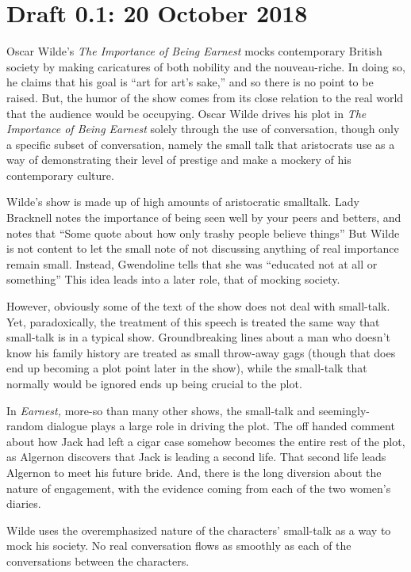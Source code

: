 \documentclass[12pt]{article}[titlepage]
\newcommand{\say}[1]{``#1''}
\newcommand{\1}{\={a}}
\newcommand{\2}{\={e}}
\newcommand{\3}{\={\i}}
\newcommand{\4}{\=o}
\newcommand{\5}{\=u}
\newcommand{\6}{\={A}}
\renewcommand{\,}{\textsuperscript{,}}
\begin{document}
\section{Draft 0.1: 20 October 2018}
Oscar Wilde's \textit{The Importance of Being Earnest} mocks contemporary British society by making caricatures of both nobility and the nouveau-riche.
In doing so, he claims that his goal is \say{art for art's sake,} and so there is no point to be raised.
But, the humor of the show comes from its close relation to the real world that the audience would be occupying.
Oscar Wilde drives his plot in \textit{The Importance of Being Earnest} solely through the use of conversation, though only a specific subset of conversation, namely the small talk that aristocrats use as a way of demonstrating their level of prestige and make a mockery of his contemporary culture.

Wilde's show is made up of high amounts of aristocratic smalltalk.
Lady Bracknell notes the importance of being seen well by your peers and betters, and notes that \say{Some quote about how only trashy people believe things}
But Wilde is not content to let the small note of not discussing anything of real importance remain small.
Instead, Gwendoline tells that she was \say{educated not at all or something}
This idea leads into a later role, that of mocking society.

However, obviously some of the text of the show does not deal with small-talk.
Yet, paradoxically, the treatment of this speech is treated the same way that small-talk is in a typical show.
Groundbreaking lines about a man who doesn't know his family history are treated as small throw-away gags (though that does end up becoming a plot point later in the show), while the small-talk that normally would be ignored ends up being crucial to the plot.

In \textit{Earnest,} more-so than many other shows, the small-talk and seemingly-random dialogue plays a large role in driving the plot.
The off handed comment about how Jack had left a cigar case somehow becomes the entire rest of the plot, as Algernon discovers that Jack is leading a second life.
That second life leads Algernon to meet his future bride.
And, there is the long diversion about the nature of engagement, with the evidence coming from each of the two women's diaries.

Wilde uses the overemphasized nature of the characters' small-talk as a way to mock his society.
No real conversation flows as smoothly as each of the conversations between the characters.
\end{document}
